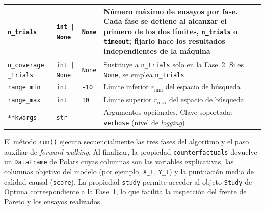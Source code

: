 \documentclass[12pt]{report} %
\begin{document}
\begin{table}[H]
{\begin{tabular}{|p{4cm}|p{3.2cm}|p{1.5cm}|p{4.5cm}|}
            \hline
            \texttt{n\_trials}      & \texttt{int | None}       & \texttt{None}    & Número máximo de ensayos por fase. Cada fase se detiene al alcanzar el primero de los dos límites, \texttt{n\_trials} o \texttt{timeout}; fijarlo hace los resultados independientes de la máquina \\
            \hline
            \texttt{n\_coverage
                \_trials}     & \texttt{int | None}       & \texttt{None}    & Sustituye a \texttt{n\_trials} solo en la Fase~2. Si es \texttt{None}, se emplea \texttt{n\_trials}                                                                                                      \\
            \hline
            \texttt{range\_min}     & \texttt{int}              & \texttt{-10}     & Límite inferior $r_{\min}$ del espacio de búsqueda                                                                                                                                                 \\
            \hline
            \texttt{range\_max}     & \texttt{int}              & \texttt{10}      & Límite superior $r_{\max}$ del espacio de búsqueda                                                                                                                                                 \\
            \hline
            \texttt{**kwargs}       & \texttt{str}              & ---              & Argumentos opcionales. Clave soportada: \texttt{verbose} (nivel de \textit{logging})                                                                                                               \\
            \hline
        \end{tabular}}
\end{table}

El método \texttt{run()} ejecuta secuencialmente las tres fases del algoritmo y el paso auxiliar de \textit{forward walking}. Al finalizar, la propiedad \texttt{counterfactuals} devuelve un \texttt{DataFrame} de Polars cuyas columnas son las variables explicativas, las columnas objetivo del modelo (por ejemplo, \texttt{X\_t}, \texttt{Y\_t}) y la puntuación media de calidad causal (\texttt{score}). La propiedad \texttt{study} permite acceder al objeto \texttt{Study} de Optuna correspondiente a la Fase~1, lo que facilita la inspección del frente de Pareto y los ensayos realizados.
\end{document}
